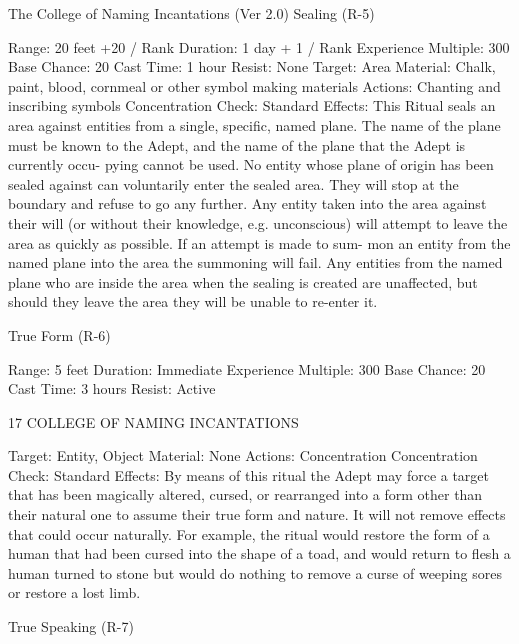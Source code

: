 \begin{Chapter}{The College of Naming Incantations (Ver 2.0)}
Sealing (R-5) 

Range: 20 feet +20 / Rank 
Duration: 1 day + 1 / Rank 
Experience Multiple: 300 
Base Chance: 20%
Cast Time: 1 hour 
Resist: None 
Target: Area 
Material:  Chalk,  paint,  blood,  cornmeal  or  other 
symbol making materials 
Actions: Chanting and inscribing symbols 
Concentration Check: Standard 
Effects:  This  Ritual  seals  an  area  against  entities 
from a single, specific, named plane. The name of 
the  plane  must  be  known  to  the  Adept,  and  the 
name of the plane that the Adept is currently occu-
pying  cannot  be  used.  No  entity  whose  plane  of 
origin has been sealed against can voluntarily enter 
the sealed area. They will stop at the boundary and 
refuse  to  go  any  further.  Any  entity  taken into  the 
area against their will (or without their knowledge, 
e.g.  unconscious)  will  attempt  to  leave  the  area  as 
quickly  as  possible.  If  an  attempt  is made  to  sum-
mon  an  entity  from  the  named  plane  into  the  area 
the  summoning  will  fail.  Any  entities  from  the 
named  plane  who  are  inside  the  area  when  the 
sealing  is  created  are  unaffected,  but  should  they 
leave the area they will be unable to re-enter it. 

True Form (R-6) 

Range: 5 feet 
Duration: Immediate 
Experience Multiple: 300 
Base Chance: 20%
Cast Time: 3 hours 
Resist: Active 

17 COLLEGE OF NAMING INCANTATIONS 

Target: Entity, Object 
Material: None 
Actions: Concentration 
Concentration Check: Standard 
Effects:  By  means  of  this  ritual  the  Adept  may 
force  a  target  that  has  been  magically  altered, 
cursed,  or  rearranged  into  a  form  other  than  their 
natural one to assume their true form and nature. It 
will  not  remove  effects  that  could  occur  naturally. 
For example, the ritual would restore the form of a 
human  that  had  been  cursed  into  the  shape  of  a 
toad,  and  would  return  to  flesh  a  human  turned  to 
stone  but  would  do  nothing  to  remove  a  curse  of 
weeping sores or restore a lost limb. 

True Speaking (R-7) 


\end{Chapter}
